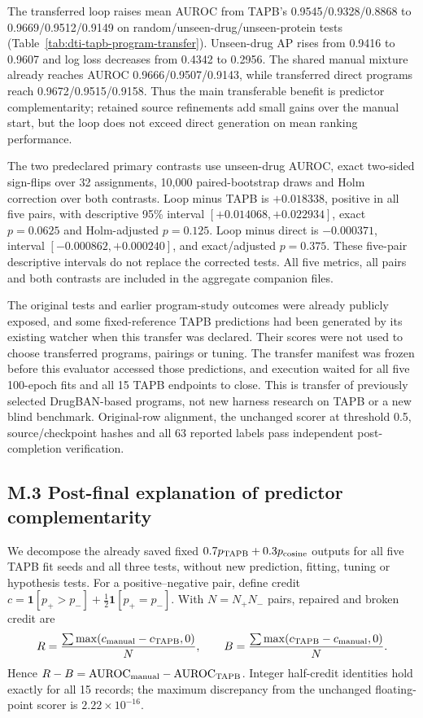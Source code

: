 The transferred loop raises mean AUROC from TAPB's 0.9545/0.9328/0.8868 to 0.9669/0.9512/0.9149 on random/unseen-drug/unseen-protein tests (Table~\ref{tab:dti-tapb-program-transfer}). Unseen-drug AP rises from 0.9416 to 0.9607 and log loss decreases from 0.4342 to 0.2956. The shared manual mixture already reaches AUROC 0.9666/0.9507/0.9143, while transferred direct programs reach 0.9672/0.9515/0.9158. Thus the main transferable benefit is predictor complementarity; retained source refinements add small gains over the manual start, but the loop does not exceed direct generation on mean ranking performance.

The two predeclared primary contrasts use unseen-drug AUROC, exact two-sided sign-flips over 32 assignments, 10,000 paired-bootstrap draws and Holm correction over both contrasts. Loop minus TAPB is $+0.018338$, positive in all five pairs, with descriptive 95\% interval $[+0.014068,+0.022934]$, exact $p=0.0625$ and Holm-adjusted $p=0.125$. Loop minus direct is $-0.000371$, interval $[-0.000862,+0.000240]$, and exact/adjusted $p=0.375$. These five-pair descriptive intervals do not replace the corrected tests. All five metrics, all pairs and both contrasts are included in the aggregate companion files.

The original tests and earlier program-study outcomes were already publicly exposed, and some fixed-reference TAPB predictions had been generated by its existing watcher when this transfer was declared. Their scores were not used to choose transferred programs, pairings or tuning. The transfer manifest was frozen before this evaluator accessed those predictions, and execution waited for all five 100-epoch fits and all 15 TAPB endpoints to close. This is transfer of previously selected DrugBAN-based programs, not new harness research on TAPB or a new blind benchmark. Original-row alignment, the unchanged scorer at threshold 0.5, source/checkpoint hashes and all 63 reported labels pass independent post-completion verification.

\subsection*{M.3 Post-final explanation of predictor complementarity}
We decompose the already saved fixed $0.7p_{\rm TAPB}+0.3p_{\rm cosine}$ outputs for all five TAPB fit seeds and all three tests, without new prediction, fitting, tuning or hypothesis tests. For a positive--negative pair, define credit $c=\mathbf{1}[p_+>p_-]+\tfrac12\mathbf{1}[p_+=p_-]$. With $N=N_+N_-$ pairs, repaired and broken credit are
\[
R=\frac{\sum\max(c_{\rm manual}-c_{\rm TAPB},0)}{N},\qquad
B=\frac{\sum\max(c_{\rm TAPB}-c_{\rm manual},0)}{N}.
\]
Hence $R-B=\mathrm{AUROC}_{\rm manual}-\mathrm{AUROC}_{\rm TAPB}$. Integer half-credit identities hold exactly for all 15 records; the maximum discrepancy from the unchanged floating-point scorer is $2.22\times10^{-16}$.

